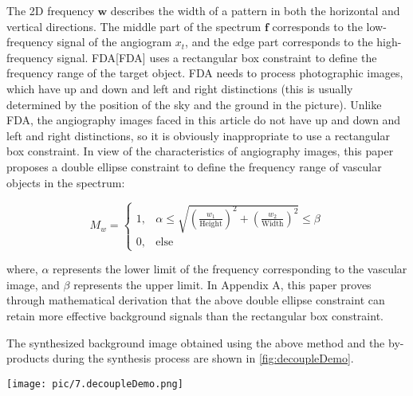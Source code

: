 The 2D frequency $\mathbf{w}$ describes the width of a pattern in both the horizontal and vertical directions. The middle part of the spectrum $\mathbf{f}$ corresponds to the low-frequency signal of the angiogram $x_t$, and the edge part corresponds to the high-frequency signal. 
FDA[FDA] uses a rectangular box constraint to define the frequency range of the target object. 
FDA needs to process photographic images, 
which have up and down and left and right distinctions (this is usually determined by the position of the sky and the ground in the picture). 
Unlike FDA, the angiography images faced in this article do not have up and down and left and right distinctions, 
so it is obviously inappropriate to use a rectangular box constraint. 
In view of the characteristics of angiography images, this paper proposes a double ellipse constraint to define the frequency range of vascular objects in the spectrum:

\begin{equation}
  M_w = 
  \begin{cases} 
  1, & \alpha \leq \sqrt{\left(\frac{w_1}{\text{Height}}\right)^2 + \left(\frac{w_2}{\text{Width}}\right)^2} \leq \beta \\
  0, & \text{else}
  \end{cases}
\end{equation}
  
where, $\alpha$ represents the lower limit of the frequency corresponding to the vascular image, and $\beta$ represents the upper limit. In Appendix A, this paper proves through mathematical derivation that the above double ellipse constraint can retain more effective background signals than the rectangular box constraint.

The synthesized background image obtained using the above method and the by-products during the synthesis process are shown in \cref{fig:decoupleDemo}.

\begin{figure*}[htbp]
  \centering
  \texttt{[image: pic/7.decoupleDemo.png]}
  \caption{Blood vessel corresponding frequency range}
  \label{fig:decoupleDemo}
\end{figure*}


